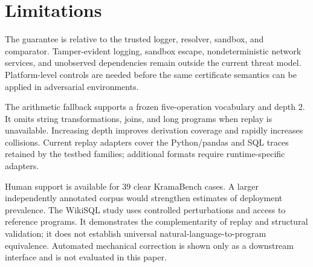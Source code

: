 \section{Limitations}\label{sec:limitations}

The guarantee is relative to the trusted logger, resolver, sandbox, and comparator. Tamper-evident logging, sandbox escape, nondeterministic network services, and unobserved dependencies remain outside the current threat model. Platform-level controls are needed before the same certificate semantics can be applied in adversarial environments.

The arithmetic fallback supports a frozen five-operation vocabulary and depth 2. It omits string transformations, joins, and long programs when replay is unavailable. Increasing depth improves derivation coverage and rapidly increases collisions. Current replay adapters cover the Python/pandas and SQL traces retained by the testbed families; additional formats require runtime-specific adapters.

Human support is available for 39 clear KramaBench cases. A larger independently annotated corpus would strengthen estimates of deployment prevalence. The WikiSQL study uses controlled perturbations and access to reference programs. It demonstrates the complementarity of replay and structural validation; it does not establish universal natural-language-to-program equivalence. Automated mechanical correction is shown only as a downstream interface and is not evaluated in this paper.
